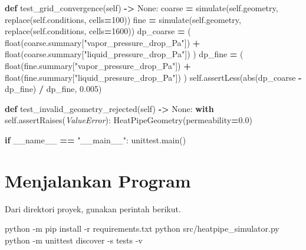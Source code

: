 \documentclass[
  12pt,a4paper,oneside]{report}
\newenvironment{Shaded}{\begin{snugshade}}{\end{snugshade}}
\newcommand{\AttributeTok}[1]{\textcolor[rgb]{0.77,0.63,0.00}{#1}}
\newcommand{\BuiltInTok}[1]{#1}
\newcommand{\ControlFlowTok}[1]{\textcolor[rgb]{0.13,0.29,0.53}{\textbf{#1}}}
\newcommand{\DecValTok}[1]{\textcolor[rgb]{0.00,0.00,0.81}{#1}}
\newcommand{\ExtensionTok}[1]{#1}
\newcommand{\FloatTok}[1]{\textcolor[rgb]{0.00,0.00,0.81}{#1}}
\newcommand{\KeywordTok}[1]{\textcolor[rgb]{0.13,0.29,0.53}{\textbf{#1}}}
\newcommand{\NormalTok}[1]{#1}
\newcommand{\OperatorTok}[1]{\textcolor[rgb]{0.81,0.36,0.00}{\textbf{#1}}}
\newcommand{\PreprocessorTok}[1]{\textcolor[rgb]{0.56,0.35,0.01}{\textit{#1}}}
\newcommand{\StringTok}[1]{\textcolor[rgb]{0.31,0.60,0.02}{#1}}
\newcommand{\VariableTok}[1]{\textcolor[rgb]{0.00,0.00,0.00}{#1}}
\begin{document}
\begin{Shaded}
\begin{Highlighting}[]
    \KeywordTok{def}\NormalTok{ test\_grid\_convergence(}\VariableTok{self}\NormalTok{) }\OperatorTok{{-}\textgreater{}} \VariableTok{None}\NormalTok{:}
\NormalTok{        coarse }\OperatorTok{=}\NormalTok{ simulate(}\VariableTok{self}\NormalTok{.geometry, replace(}\VariableTok{self}\NormalTok{.conditions, cells}\OperatorTok{=}\DecValTok{100}\NormalTok{))}
\NormalTok{        fine }\OperatorTok{=}\NormalTok{ simulate(}\VariableTok{self}\NormalTok{.geometry, replace(}\VariableTok{self}\NormalTok{.conditions, cells}\OperatorTok{=}\DecValTok{1600}\NormalTok{))}
\NormalTok{        dp\_coarse }\OperatorTok{=}\NormalTok{ (}
            \BuiltInTok{float}\NormalTok{(coarse.summary[}\StringTok{"vapor\_pressure\_drop\_Pa"}\NormalTok{])}
            \OperatorTok{+} \BuiltInTok{float}\NormalTok{(coarse.summary[}\StringTok{"liquid\_pressure\_drop\_Pa"}\NormalTok{])}
\NormalTok{        )}
\NormalTok{        dp\_fine }\OperatorTok{=}\NormalTok{ (}
            \BuiltInTok{float}\NormalTok{(fine.summary[}\StringTok{"vapor\_pressure\_drop\_Pa"}\NormalTok{])}
            \OperatorTok{+} \BuiltInTok{float}\NormalTok{(fine.summary[}\StringTok{"liquid\_pressure\_drop\_Pa"}\NormalTok{])}
\NormalTok{        )}
        \VariableTok{self}\NormalTok{.assertLess(}\BuiltInTok{abs}\NormalTok{(dp\_coarse }\OperatorTok{{-}}\NormalTok{ dp\_fine) }\OperatorTok{/}\NormalTok{ dp\_fine, }\FloatTok{0.005}\NormalTok{)}

    \KeywordTok{def}\NormalTok{ test\_invalid\_geometry\_rejected(}\VariableTok{self}\NormalTok{) }\OperatorTok{{-}\textgreater{}} \VariableTok{None}\NormalTok{:}
        \ControlFlowTok{with} \VariableTok{self}\NormalTok{.assertRaises(}\PreprocessorTok{ValueError}\NormalTok{):}
\NormalTok{            HeatPipeGeometry(permeability}\OperatorTok{=}\FloatTok{0.0}\NormalTok{)}


\ControlFlowTok{if} \VariableTok{\_\_name\_\_} \OperatorTok{==} \StringTok{"\_\_main\_\_"}\NormalTok{:}
\NormalTok{    unittest.main()}
\end{Highlighting}
\end{Shaded}

\hypertarget{menjalankan-program}{%
\section{Menjalankan Program}\label{menjalankan-program}}

Dari direktori proyek, gunakan perintah berikut.

\begin{Shaded}
\begin{Highlighting}[]
\ExtensionTok{python} \AttributeTok{{-}m}\NormalTok{ pip install }\AttributeTok{{-}r}\NormalTok{ requirements.txt}
\ExtensionTok{python}\NormalTok{ src/heatpipe\_simulator.py}
\ExtensionTok{python} \AttributeTok{{-}m}\NormalTok{ unittest discover }\AttributeTok{{-}s}\NormalTok{ tests }\AttributeTok{{-}v}
\end{Highlighting}
\end{Shaded}
\end{document}
